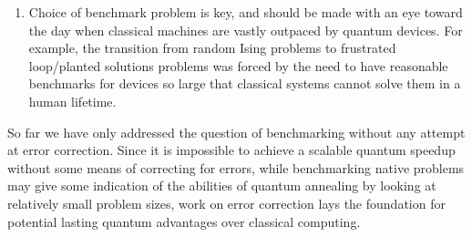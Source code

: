 \begin{enumerate}
	\item Choice of benchmark problem is key, and should be made with an eye toward the day when classical machines are vastly outpaced by quantum devices. For example, the transition from random Ising problems to frustrated loop/planted solutions problems was forced by the need to have reasonable benchmarks for devices so large that classical systems cannot solve them in a human lifetime.
\end{enumerate}

So far we have only addressed the question of benchmarking without any attempt at error correction. Since it is impossible to achieve a scalable quantum speedup without some means of correcting for errors, while benchmarking native problems may give some indication of the abilities of quantum annealing by looking at relatively small problem sizes, work on error correction lays the foundation for potential lasting quantum advantages over classical computing.



